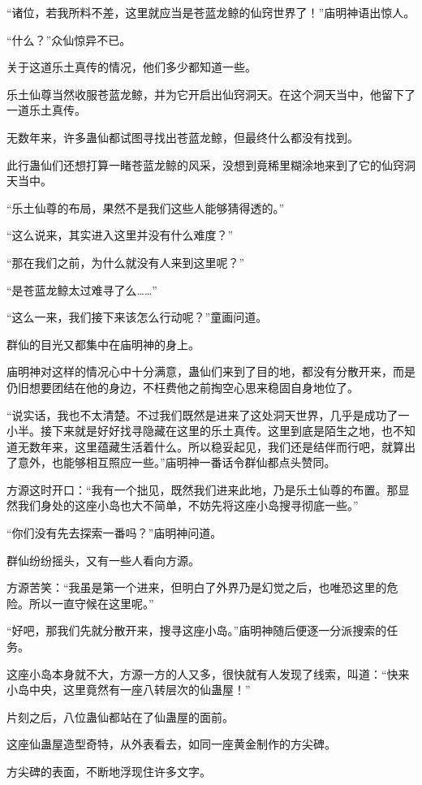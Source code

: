 \begin{this_body}
“诸位，若我所料不差，这里就应当是苍蓝龙鲸的仙窍世界了！”庙明神语出惊人。

“什么？”众仙惊异不已。

关于这道乐土真传的情况，他们多少都知道一些。

乐土仙尊当然收服苍蓝龙鲸，并为它开启出仙窍洞天。在这个洞天当中，他留下了一道乐土真传。

无数年来，许多蛊仙都试图寻找出苍蓝龙鲸，但最终什么都没有找到。

此行蛊仙们还想打算一睹苍蓝龙鲸的风采，没想到竟稀里糊涂地来到了它的仙窍洞天当中。

“乐土仙尊的布局，果然不是我们这些人能够猜得透的。”

“这么说来，其实进入这里并没有什么难度？”

“那在我们之前，为什么就没有人来到这里呢？”

“是苍蓝龙鲸太过难寻了么……”

“这么一来，我们接下来该怎么行动呢？”童画问道。

群仙的目光又都集中在庙明神的身上。

庙明神对这样的情况心中十分满意，蛊仙们来到了目的地，都没有分散开来，而是仍旧想要团结在他的身边，不枉费他之前掏空心思来稳固自身地位了。

“说实话，我也不太清楚。不过我们既然是进来了这处洞天世界，几乎是成功了一小半。接下来就是好好找寻隐藏在这里的乐土真传。这里到底是陌生之地，也不知道无数年来，这里蕴藏生活着什么。所以稳妥起见，我们还是结伴而行吧，就算出了意外，也能够相互照应一些。”庙明神一番话令群仙都点头赞同。

方源这时开口：“我有一个拙见，既然我们进来此地，乃是乐土仙尊的布置。那显然我们身处的这座小岛也大不简单，不妨先将这座小岛搜寻彻底一些。”

“你们没有先去探索一番吗？”庙明神问道。

群仙纷纷摇头，又有一些人看向方源。

方源苦笑：“我虽是第一个进来，但明白了外界乃是幻觉之后，也唯恐这里的危险。所以一直守候在这里呢。”

“好吧，那我们先就分散开来，搜寻这座小岛。”庙明神随后便逐一分派搜索的任务。

这座小岛本身就不大，方源一方的人又多，很快就有人发现了线索，叫道：“快来小岛中央，这里竟然有一座八转层次的仙蛊屋！”

片刻之后，八位蛊仙都站在了仙蛊屋的面前。

这座仙蛊屋造型奇特，从外表看去，如同一座黄金制作的方尖碑。

方尖碑的表面，不断地浮现住许多文字。


\end{this_body}
